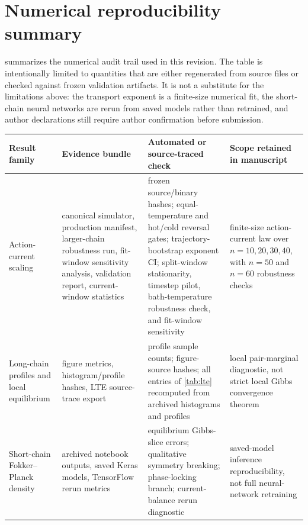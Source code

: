 \documentclass[11pt,a4paper]{article}
\theoremstyle{definition}
\numberwithin{equation}{section}   %
\begin{document}
\section*{Numerical reproducibility summary}

 summarizes the numerical audit trail used in this
revision. The table is intentionally limited to quantities that are either
regenerated from source files or checked against frozen validation artifacts.
It is not a substitute for the limitations above: the transport exponent is a
finite-size numerical fit, the short-chain neural networks are rerun from saved
models rather than retrained, and author declarations still require author
confirmation before submission.

\begin{table}[ht]\centering
\small
\setlength{\tabcolsep}{2pt}
\begin{tabular}{>{\raggedright\arraybackslash}p{}
                >{\raggedright\arraybackslash}p{}
                >{\raggedright\arraybackslash}p{}
                >{\raggedright\arraybackslash}p{}}
\toprule
Result family & Evidence bundle & Automated or source-traced check & Scope retained in manuscript \\
\midrule
Action-current scaling &
canonical simulator, production manifest, larger-chain robustness run,
fit-window sensitivity analysis, validation report, current-window statistics &
frozen source/binary hashes; equal-temperature and hot/cold reversal gates;
trajectory-bootstrap exponent CI; split-window stationarity, timestep pilot,
bath-temperature robustness check, and fit-window sensitivity &
finite-size action-current law over $n=10,20,30,40$, with $n=50$
and $n=60$ robustness checks \\
\midrule
Long-chain profiles and local equilibrium &
figure metrics, histogram/profile hashes, LTE source-trace export &
profile sample counts; figure-source hashes; all entries of \cref{tab:lte}
recomputed from archived histograms and profiles &
local pair-marginal diagnostic, not strict local Gibbs convergence theorem \\
\midrule
Short-chain Fokker--Planck density &
archived notebook outputs, saved Keras models, TensorFlow rerun metrics &
equilibrium Gibbs-slice errors; qualitative symmetry breaking; phase-locking
branch; current-balance rerun diagnostic &
saved-model inference reproducibility, not full neural-network retraining \\
\midrule

\end{tabular}
\end{table}
\end{document}
